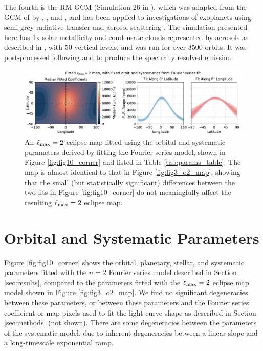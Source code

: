 \documentclass[twocolumn]{aastex631}
\begin{document}
The fourth is the RM-GCM (Simulation 26 in \citealp{bell2023wasp43b}), which was adapted from the GCM of \citet{hoskins1975multi} by \citet{menou2009atmospheric}, \citet{rauscher2010three}, and \citet{rauscher2012general}, and has been applied to investigations of exoplanets using semi-grey radiative transfer and aerosol scattering \citep{roman2017modeling,roman2021clouds}. The simulation presented here has 1x solar metallicity and condensate clouds represented by aerosols as described in \citet{bell2023wasp43b}, with 50 vertical levels, and was run for over 3500 orbits. It was post-processed following \citet{zhang2017constraining} and \citet{malsky2021modeling} to produce the spectrally resolved emission.


\begin{figure}
    \centering
    \includegraphics[width=\textwidth]{fig11_map_fourierfix.pdf}
    \caption{An $\ell_{\rm max}=2$ eclipse map fitted using the orbital and systematic parameters derived by fitting the Fourier series model, shown in Figure \ref{fig:fig10_corner} and listed in Table \ref{tab:params_table}. The map is almost identical to that in Figure \ref{fig:fig3_o2_map}, showing that the small (but statistically significant) differences between the two fits in Figure \ref{fig:fig10_corner} do not meaningfully affect the resulting $\ell_{\rm max}=2$ eclipse map.}
    \label{fig:fig11_map_o2_fourier_params}
\end{figure}





\section{Orbital and Systematic Parameters}\label{ap:params}

Figure \ref{fig:fig10_corner} shows the orbital, planetary, stellar, and systematic parameters fitted with the $n=2$ Fourier series model described in Section \ref{sec:results}, compared to the parameters fitted with the $\ell_{\rm max}=2$ eclipse map model shown in Figure \ref{fig:fig3_o2_map}. We find no significant degeneracies between these parameters, or between these parameters and the Fourier series coefficient or map pixels used to fit the light curve shape as described in Section \ref{sec:methods} (not shown). There are some degeneracies between the parameters of the systematic model, due to inherent degeneracies between a linear slope and a long-timescale exponential ramp.
\end{document}
